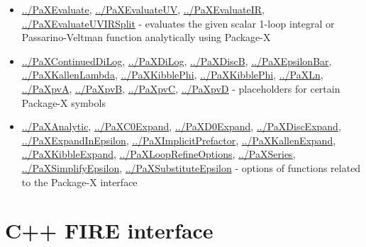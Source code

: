 \documentclass[../FeynHelpersManual.tex]{subfiles}
\begin{document}
\begin{itemize}
\tightlist
\item
  \hyperlink{../paxevaluate}{../PaXEvaluate},
  \hyperlink{../paxevaluateuv}{../PaXEvaluateUV},
  \hyperlink{../paxevaluateir}{../PaXEvaluateIR},
  \hyperlink{../paxevaluateuvirsplit}{../PaXEvaluateUVIRSplit} -
  evaluates the given scalar 1-loop integral or Passarino-Veltman
  function analytically using Package-X
\item
  \hyperlink{../paxcontinueddilog}{../PaXContinuedDiLog},
  \hyperlink{../paxdilog}{../PaXDiLog},
  \hyperlink{../paxdiscb}{../PaXDiscB},
  \hyperlink{../paxepsilonbar}{../PaXEpsilonBar},
  \hyperlink{../paxkallenlambda}{../PaXKallenLambda},
  \hyperlink{../paxkibblephi}{../PaXKibblePhi},
  \hyperlink{../paxkibblephi}{../PaXKibblePhi},
  \hyperlink{../paxln}{../PaXLn}, \hyperlink{../paxpva}{../PaXpvA},
  \hyperlink{../paxpvb}{../PaXpvB}, \hyperlink{../paxpvc}{../PaXpvC},
  \hyperlink{../paxpvd}{../PaXpvD} - placeholders for certain Package-X
  symbols
\item
  \hyperlink{../paxanalytic}{../PaXAnalytic},
  \hyperlink{../paxc0expand}{../PaXC0Expand},
  \hyperlink{../paxd0expand}{../PaXD0Expand},
  \hyperlink{../paxdiscexpand}{../PaXDiscExpand},
  \hyperlink{../paxexpandinepsilon}{../PaXExpandInEpsilon},
  \hyperlink{../paximplicitprefactor}{../PaXImplicitPrefactor},
  \hyperlink{../paxkallenexpand}{../PaXKallenExpand},
  \hyperlink{../paxkibbleexpand}{../PaXKibbleExpand},
  \hyperlink{../paxlooprefineoptions}{../PaXLoopRefineOptions},
  \hyperlink{../paxseries}{../PaXSeries},
  \hyperlink{../paxsimplifyepsilon}{../PaXSimplifyEpsilon},
  \hyperlink{../paxsubstituteepsilon}{../PaXSubstituteEpsilon} - options
  of functions related to the Package-X interface
\end{itemize}

\hypertarget{c++ fire interface}{
\section{C++ FIRE interface}\label{c++ fire interface}}
\end{document}
